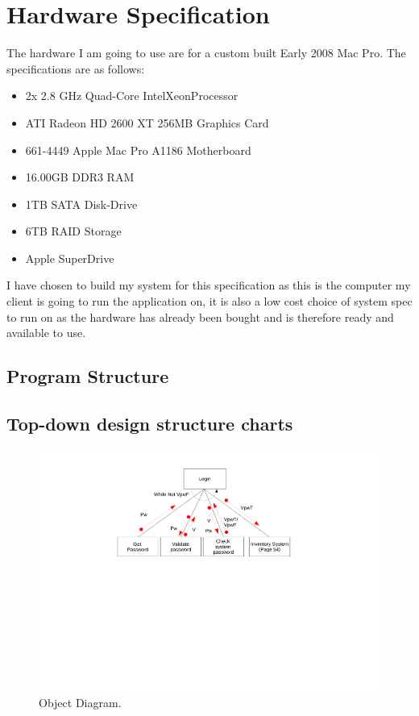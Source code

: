 \section{Hardware Specification}

The hardware I am going to use are for a custom built Early 2008 Mac Pro. The specifications are as follows:
\begin{itemize}
    \item 2x 2.8 GHz Quad-Core Intel\textregistered Xeon\texttrademark Processor
    \item ATI Radeon HD 2600 XT 256MB Graphics Card
    \item 661-4449 Apple Mac Pro A1186 Motherboard
    \item 16.00GB DDR3 RAM
    \item 1TB SATA Disk-Drive
    \item 6TB RAID Storage
    \item Apple SuperDrive \\
\end{itemize}

I have chosen to build my system for this specification as this is the computer my client is going to run the application on, it is also a low cost choice of system spec to run on as the hardware has already been bought and is therefore ready and available to use.

\begin{landscape}

\section{Program Structure}

\subsection{Top-down design structure charts}

\begin{figure}[H]
    \begin{center}
    \includegraphics[width=500px]{./Design/top_down_design/Top_down_design.pdf}
    \caption{Object Diagram.} \label{fig:object_diagram}
    \end{center}
\end{figure}

\end{landscape}


